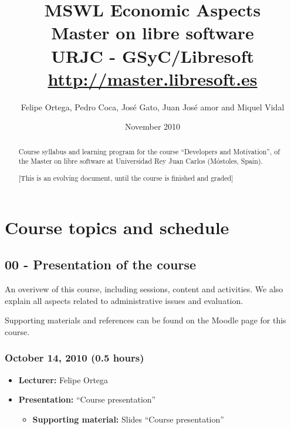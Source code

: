 \documentclass[a4paper]{article}
\title{MSWL Economic Aspects \\
Master on libre software \\
URJC - GSyC/Libresoft \\
\url{http://master.libresoft.es}}
\author{Felipe Ortega, Pedro Coca, José Gato, Juan José amor and Miquel Vidal}
\date{November 2010}
\begin{document}
\maketitle

\begin{abstract}
Course syllabus and learning program for the course ``Developers and Motivation'', of the Master on libre software at Universidad Rey Juan Carlos (Móstoles, Spain).

[This is an evolving document, until the course is finished and graded]
\end{abstract}

\tableofcontents

\section{Course topics and schedule}

\subsection{00 - Presentation of the course}

An overivew of this course, including sessions, content and activities. We also explain all aspects related to administrative issues and evaluation.

Supporting materials and references can be found on the Moodle page for this course.

\subsubsection{October 14, 2010 (0.5 hours)}

\begin{itemize}
\item \textbf{Lecturer:} Felipe Ortega
\item \textbf{Presentation:} ``Course presentation''
  \begin{itemize}
  \item \textbf{Supporting material:} Slides ``Course presentation''
  \end{itemize}
\end{itemize}
\end{document}
